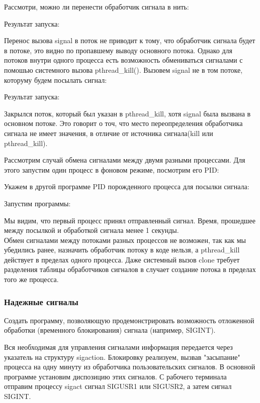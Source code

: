 \documentclass[a4paper]{article}
\begin{document}
	Рассмотри, можно ли перенести обработчик сигнала в нить:
	
	Результат запуска:
	
	Перенос вызова signal в поток не приводит к тому, что обработчик сигнала будет в потоке, это видно по пропавшему выводу основного потока. Однако для потоков внутри одного процесса есть возможность обмениваться сигналами с помошью системного вызова pthread\_kill(). Вызовем signal не в том потоке, которуму будем посылать сигнал:
	
	Результат запуска:
	
	Закрылся поток, который был указан в pthread\_kill, хотя signal была вызвана в основном потоке. Это говорит о точ, что место переопределения обработчика сигнала не имеет значения, в отличие от источника сигнала(kill или pthread\_kill). 
	
	Рассмотрим случай обмена сигналами между двумя разными процессами. Для этого запустим один процесс в фоновом режиме, посмотрим его PID:	
	

	Укажем в другой программе PID порожденного процесса для посылки сигнала:
	
	
	Запустим программы:
	
	
	Мы видим, что первый процесс принял отправленный сигнал. Время, прошедшее между посылкой и обработкой сигнала менее 1 секунды.\\
	
	Обмен сигналами между потоками разных процессов не возможен, так как мы убедились ранее, назначить обработчик потоку в коде нельзя, а pthread\_kill действует в пределах одного процесса. Даже системный вызов clone  требует разделения таблицы обработчиков сигналов в случает создание потока в пределах того же процесса.
	
	\subsubsection{Надежные сигналы}
	Создать программу, позволяющую продемонстрировать возможность отложенной обработки (временного блокирования) сигнала (например, SIGINT).
	
	Вся необходимая для управления сигналами информация передается через указатель на структуру sigaction. Блокировку реализуем, вызвав "засыпание" процесса на одну минуту из обработчика пользовательских сигналов. В основной программе установим диспозицию этих сигналов. С рабочего терминала отправим процессу sigact сигнал SIGUSR1 или SIGUSR2, а затем сигнал SIGINT.
	
\end{document}
